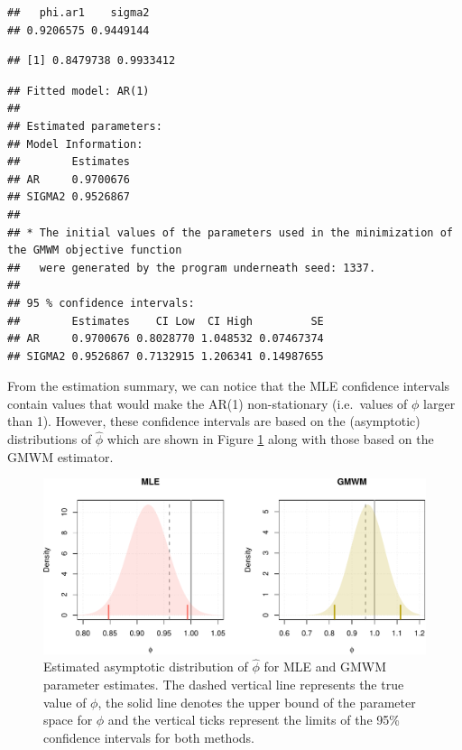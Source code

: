 \documentclass[]{book}
\newenvironment{Shaded}{\begin{snugshade}}{\end{snugshade}}
\newcommand{\KeywordTok}[1]{\textcolor[rgb]{0.13,0.29,0.53}{\textbf{#1}}}
\newcommand{\DecValTok}[1]{\textcolor[rgb]{0.00,0.00,0.81}{#1}}
\newcommand{\FloatTok}[1]{\textcolor[rgb]{0.00,0.00,0.81}{#1}}
\newcommand{\StringTok}[1]{\textcolor[rgb]{0.31,0.60,0.02}{#1}}
\newcommand{\CommentTok}[1]{\textcolor[rgb]{0.56,0.35,0.01}{\textit{#1}}}
\newcommand{\OperatorTok}[1]{\textcolor[rgb]{0.81,0.36,0.00}{\textbf{#1}}}
\newcommand{\NormalTok}[1]{#1}
\theoremstyle{definition}
\theoremstyle{definition}
\theoremstyle{definition}
\theoremstyle{remark}
\begin{document}
\begin{verbatim}
##   phi.ar1    sigma2 
## 0.9206575 0.9449144
\end{verbatim}

\begin{Shaded}
\end{Shaded}

\begin{verbatim}
## [1] 0.8479738 0.9933412
\end{verbatim}

\begin{verbatim}
## Fitted model: AR(1)
## 
## Estimated parameters:
## Model Information: 
##        Estimates
## AR     0.9700676
## SIGMA2 0.9526867
## 
## * The initial values of the parameters used in the minimization of the GMWM objective function 
##   were generated by the program underneath seed: 1337. 
## 
## 95 % confidence intervals:
##        Estimates    CI Low  CI High         SE
## AR     0.9700676 0.8028770 1.048532 0.07467374
## SIGMA2 0.9526867 0.7132915 1.206341 0.14987655
\end{verbatim}

From the estimation summary, we can notice that the MLE confidence
intervals contain values that would make the AR(1) non-stationary
(i.e.~values of \(\phi\) larger than 1). However, these confidence
intervals are based on the (asymptotic) distributions of \(\hat{\phi}\)
which are shown in Figure \ref{fig:asymIC} along with those based on the
GMWM estimator.

\begin{figure}
\centering
\includegraphics{ts_files/figure-latex/asymIC-1.pdf}
\caption{\label{fig:asymIC}Estimated asymptotic distribution of
\(\hat{\phi}\) for MLE and GMWM parameter estimates. The dashed vertical
line represents the true value of \(\phi\), the solid line denotes the
upper bound of the parameter space for \(\phi\) and the vertical ticks
represent the limits of the 95\% confidence intervals for both methods.}
\end{figure}
\end{document}
